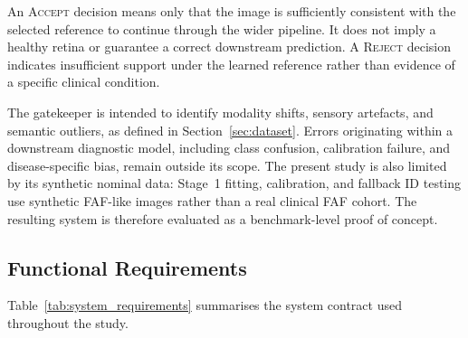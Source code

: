 \documentclass[fleqn,12pt]{olplainarticle}
\begin{document}
An \textsc{Accept} decision means only that the image is sufficiently
consistent with the selected reference to continue through the wider
pipeline. It does not imply a healthy retina or guarantee a correct
downstream prediction. A \textsc{Reject} decision indicates insufficient
support under the learned reference rather than evidence of a specific
clinical condition.

The gatekeeper is intended to identify modality shifts, sensory artefacts, and
semantic outliers, as defined in Section~\ref{sec:dataset}. Errors originating
within a downstream diagnostic model, including class confusion, calibration
failure, and disease-specific bias, remain outside its scope. The present
study is also limited by its synthetic nominal data: Stage~1 fitting,
calibration, and fallback ID testing use synthetic FAF-like images rather than
a real clinical FAF cohort. The resulting system is therefore evaluated as a
benchmark-level proof of concept.

\subsection{Functional Requirements}
\label{subsec:functional_requirements}

Table~\ref{tab:system_requirements} summarises the system contract used
throughout the study.
\end{document}
